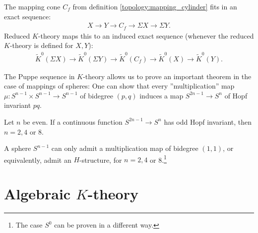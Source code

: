 {    \begin{property}
        The mapping cone $C_f$ from definition \ref{topology:mapping_cylinder} fits in an exact sequence:
        \begin{gather}
            X\longrightarrow Y\longrightarrow C_f\longrightarrow \Sigma X\longrightarrow \Sigma Y.
        \end{gather}
        Reduced $K$-theory maps this to an induced exact sequence (whenever the reduced $K$-theory is defined for $X,Y$):
        \begin{gather}
            \widetilde{K}^0(\Sigma X)\longrightarrow\widetilde{K}^0(\Sigma Y)\longrightarrow \widetilde{K}^0(C_f)\longrightarrow\widetilde{K}^0(X)\longrightarrow\widetilde{K}^0(Y).
        \end{gather}
    \end{property}
    The Puppe sequence in $K$-theory allows us to prove an important theorem in the case of mappings of spheres:
     One can show that every ''multiplication'' map $\mu: S^{n-1}\times S^{n-1}\rightarrow S^{n-1}$ of bidegree $(p,q)$ induces a map $S^{2n-1}\rightarrow S^n$ of Hopf invariant $pq$.

     \begin{theorem}
         Let $n$ be even. If a continuous function $S^{2n-1}\rightarrow S^n$ has odd Hopf invariant, then $n=2,4$ or 8.
     \end{theorem}
     \begin{result}
         A sphere $S^{n-1}$ can only admit a multiplication map of bidegree $(1,1)$, or equivalently, admit an $H$-structure, for $n=2,4$ or 8.\footnote{The case $S^0$ can be proven in a different way.}
     \end{result}

\section{\texorpdfstring{Algebraic $K$-theory}{Algebraic K-theory}}
}
